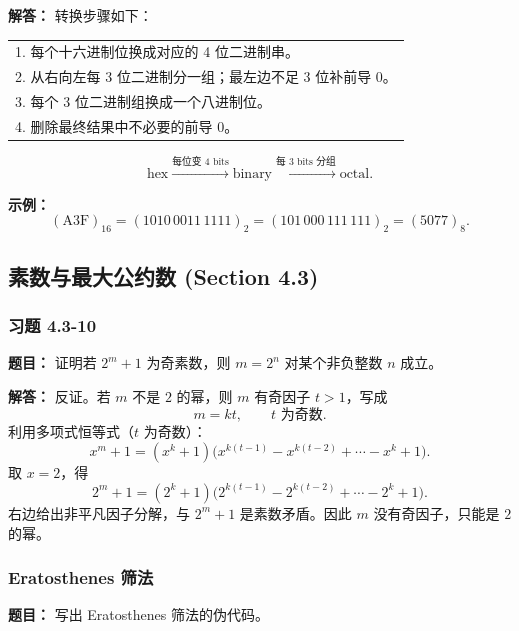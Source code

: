 \documentclass[11pt,UTF8]{article}
\begin{document}
\textbf{解答：} 转换步骤如下：
\begin{center}
\begin{tabular}{l}
\hline
1. 每个十六进制位换成对应的 4 位二进制串。\\
2. 从右向左每 3 位二进制分一组；最左边不足 3 位补前导 0。\\
3. 每个 3 位二进制组换成一个八进制位。\\
4. 删除最终结果中不必要的前导 0。\\
\hline
\end{tabular}
\end{center}

\[ \text{hex}\xrightarrow{\text{每位变 4 bits}}\text{binary}\xrightarrow{\text{每 3 bits 分组}}\text{octal}. \]

\textbf{示例：}
\[ (\text{A3F})_{16}=(1010\,0011\,1111)_2=(101\,000\,111\,111)_2=(5077)_8. \]



\subsection{素数与最大公约数 (Section 4.3)}

\subsubsection*{习题 4.3-10}
\textbf{题目：} 证明若 $2^m+1$ 为奇素数，则 $m=2^n$ 对某个非负整数 $n$ 成立。

\textbf{解答：} 反证。若 $m$ 不是 $2$ 的幂，则 $m$ 有奇因子 $t>1$，写成
\[ m=kt,\qquad t\text{ 为奇数}. \]
利用多项式恒等式（$t$ 为奇数）：
\[ x^m+1=(x^k+1)\bigl(x^{k(t-1)}-x^{k(t-2)}+\cdots-x^k+1\bigr). \]
取 $x=2$，得
\[ 2^m+1=(2^k+1)\bigl(2^{k(t-1)}-2^{k(t-2)}+\cdots-2^k+1\bigr). \]
右边给出非平凡因子分解，与 $2^m+1$ 是素数矛盾。因此 $m$ 没有奇因子，只能是 $2$ 的幂。

\subsubsection*{Eratosthenes 筛法}

\textbf{题目：} 写出 Eratosthenes 筛法的伪代码。
\end{document}
